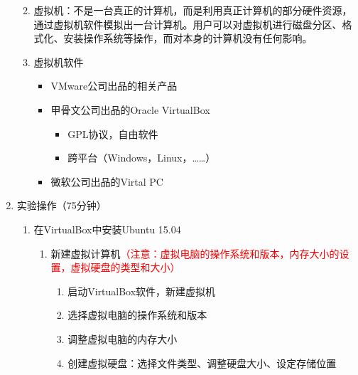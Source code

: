 \documentclass{TIJMUjiaoanSY}
\begin{document}
\begin{enumerate}
    \begin{enumerate}
      \item 虚拟机：不是一台真正的计算机，而是利用真正计算机的部分硬件资源，通过虚拟机软件模拟出一台计算机。用户可以对虚拟机进行磁盘分区、格式化、安装操作系统等操作，而对本身的计算机没有任何影响。
      \item 虚拟机软件
	\begin{itemize}
	  \item VMware公司出品的相关产品
	  \item 甲骨文公司出品的Oracle VirtualBox
	    \begin{itemize}
	      \item GPL协议，自由软件
	      \item 跨平台（Windows，Linux，……）
	    \end{itemize}
	  \item 微软公司出品的Virtal PC
	\end{itemize}
    \end{enumerate}
  \item 实验操作（75分钟）
    \begin{enumerate}
      \item 在VirtualBox中安装Ubuntu 15.04
	\begin{enumerate}
	  \item 新建虚拟计算机\textcolor{red}{（注意：虚拟电脑的操作系统和版本，内存大小的设置，虚拟硬盘的类型和大小）}
	    \begin{enumerate}
	      \item 启动VirtualBox软件，新建虚拟机
	      \item 选择虚拟电脑的操作系统和版本
	      \item 调整虚拟电脑的内存大小
	      \item 创建虚拟硬盘：选择文件类型、调整硬盘大小、设定存储位置
	    \end{enumerate}


\otherTail
\newpage
\otherHeader



\end{enumerate}
\end{enumerate}
\end{enumerate}
\end{document}
